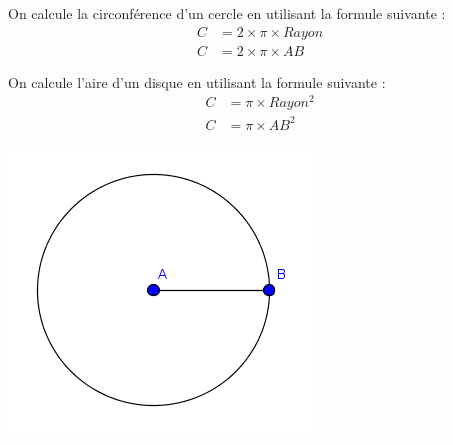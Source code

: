 \documentclass[12pt,a4paper]{article}
\begin{document}
\begin{mymeth}
	\begin{multicols}{2}
		On calcule la circonférence d'un cercle en utilisant la formule suivante :
		\begin{align*}
			C &= 2\times \pi \times Rayon\\
			C &= 2\times \pi \times AB
		\end{align*}
		
		On calcule l'aire d'un disque en utilisant la formule suivante :
		\begin{align*}
		C &= \pi \times Rayon^2\\
		C &= \pi \times AB^2
		\end{align*}
		
		\includegraphics[scale=0.7]{img/cercle}
	\end{multicols}
\end{mymeth}
\end{document}
